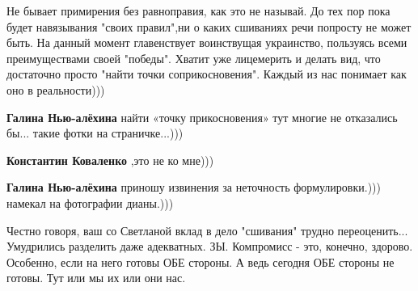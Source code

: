 \begin{itemize}
Не бывает примирения без равноправия, как это не называй. До тех пор пока будет
навязывания "своих правил",ни о каких сшиваниях речи попросту не может быть. На
данный момент главенствует воинствущая украинство, пользуясь всеми
преимуществами своей "победы". Хватит уже лицемерить и делать вид, что достаточно
просто "найти точки соприкосновения". Каждый из нас понимает как оно в
реальности)))

\begin{itemize}
 
\textbf{Галина Нью-алёхина} найти «точку прикосновения» тут многие не отказались бы... такие фотки на страничке...)))

 
\textbf{Константин Коваленко} ,это не ко мне)))

 
\textbf{Галина Нью-алёхина} приношу извинения за неточность формулировки.))) намекал на фотографии дианы.)))
\end{itemize}

 

Честно говоря, ваш со Светланой вклад в дело "сшивания" трудно переоценить...
Умудрились разделить даже адекватных. ЗЫ. Компромисс - это, конечно, здорово.
Особенно, если на него готовы ОБЕ стороны. А ведь сегодня ОБЕ стороны не
готовы. Тут или мы их или они нас.


 


\end{itemize}
